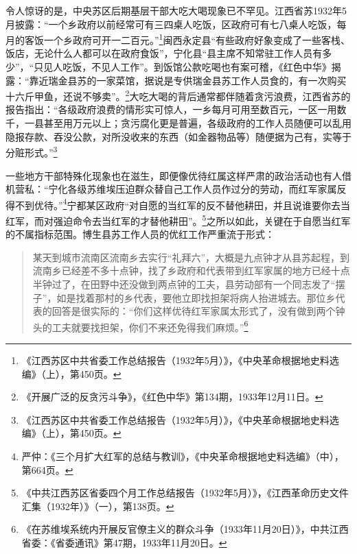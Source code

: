 令人惊讶的是，中央苏区后期基层干部大吃大喝现象已不罕见。江西省苏1932年5月披露：“一个乡政府以前经常可有三四桌人吃饭，区政府可有七八桌人吃饭，每月的客饭一个乡政府可开一二百元。”\footnote{《江西苏区中共省委工作总结报告（1932年5月）》，《中央革命根据地史料选编》（上），第450页。}闽西永定县“有些政府好象变成了一些客栈、饭店，无论什么人都可以在政府食饭”，宁化县“县主席不知常驻工作人员有多少”，“只见人吃饭，不见人工作”。到饭馆公款吃喝也有案可稽，《红色中华》揭露：“靠近瑞金县苏的一家菜馆，据说是专供瑞金县苏工作人员食的，有一次购买十六斤甲鱼，还说不够卖”。\footnote{《开展广泛的反贪污斗争》，《红色中华》第134期，1933年12月11日。}大吃大喝的背后通常都伴随着贪污浪费，江西省苏的报告指出：“各级政府浪费的情形实可惊人，一乡每月可用至数百元，一区一用数千，一县甚至用万元以上；贪污腐化更是普遍，各级政府的工作人员随便可以乱用隐报存款、吞没公款，对所没收来的东西（如金器物品等）随便据为己有，实等于分赃形式。”\footnote{《江西苏区中共省委工作总结报告（1932年5月）》，《中央革命根据地史料选编》（上），第450页。}


一些地方干部特殊化现象也在滋生，即便像优待红属这样严肃的政治活动也有人借机营私：“宁化各级苏维埃压迫群众替自己工作人员作过分的劳动，而红军家属反得不到优待。”\footnote{严仲：《三个月扩大红军的总结与教训》，《中央革命根据地史料选编》（中），第664页。}宁都某区政府“对自愿的当红军的反不替他耕田，并且说谁要你去当红军，而对强迫命令去当红军的才替他耕田”。\footnote{《中共江西苏区省委四个月工作总结报告（1932年5月）》，《江西革命历史文件汇集（1932年）》（一），第138页。}之所以如此，关键在于自愿当红军的不属指标范围。博生县苏工作人员的优红工作严重流于形式：

\begin{quote}

某天到城市流南区流南乡去实行“礼拜六”，大概是九点钟才从县苏起程，到流南乡已经差不多十点钟，找了乡政府和代表带到红军家属的地方已经十点半钟过了，在田野中还没做到两点钟的工夫，县劳动部有一个同志发了“摆子”，如是找着那村的乡代表，要他立即找担架将病人抬进城去。那位乡代表的回答是很实际的：“你们这样优待红军家属太形式了，没有做到两个钟头的工夫就要找担架，你们不来还免得我们麻烦。”\footnote{《在苏维埃系统内开展反官僚主义的群众斗争（1933年11月20日）》，中共江西省委：《省委通讯》第47期，1933年11月20日。}
\end{quote}


